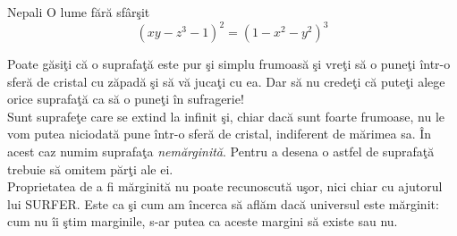 \begin{surferPage}{Nepali}
O lume f\u ar\u a sf\^ar\c sit\\

\smallskip
\[(x y - z^3 -1)^2= (1 - x^2	- y^2)^3\]

\singlespacing
Poate g\u asi\c ti c\u a o suprafa\c t\u a este pur \c si simplu frumoas\u a \c si vre\c ti s\u a o pune\c ti \^intr-o sfer\u a de cristal cu z\u apad\u a
\c si s\u a v\u a juca\c ti cu ea. Dar s\u a nu crede\c ti c\u a pute\c ti alege orice suprafa\c t\u a ca s\u a o pune\c ti \^in sufragerie!
\\
\singlespacing
Sunt suprafe\c te care se extind la infinit \c si, chiar dac\u a sunt foarte frumoase, nu le vom putea niciodat\u a  pune \^intr-o sfer\u a de cristal,
indiferent de m\u arimea sa. \^In acest caz numim suprafa\c ta {\it nem\u arginit\u a}.
Pentru a desena o astfel de suprafa\c t\u a trebuie s\u a omitem p\u ar\c ti ale ei.
\\
\singlespacing
Proprietatea de a fi m\u arginit\u a nu poate recunoscut\u a u\c sor, nici chiar cu ajutorul lui SURFER. Este ca \c si cum am \^incerca s\u a afl\u am
dac\u a universul este m\u arginit: cum nu \^ii \c stim marginile, s-ar putea ca aceste margini s\u a existe sau nu.
\end{surferPage}

